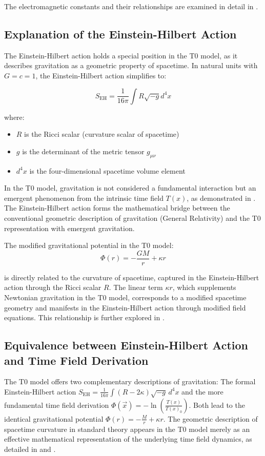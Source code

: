 \documentclass[12pt,a4paper]{article}
\newcommand{\Tfield}{T(x)}
\begin{document}
	The electromagnetic constants and their relationships are examined in detail in \cite{pascher_alpha_2025}.
	
	\subsection*{Explanation of the Einstein-Hilbert Action}
	
	The Einstein-Hilbert action holds a special position in the T0 model, as it describes gravitation as a geometric property of spacetime. In natural units with $G = c = 1$, the Einstein-Hilbert action simplifies to:
	
	\[
	S_{\mathrm{EH}} = \frac{1}{16\pi}\int R\sqrt{-g}d^4x
	\]
	
	where:
	\begin{itemize}
		\item $R$ is the Ricci scalar (curvature scalar of spacetime)
		\item $g$ is the determinant of the metric tensor $g_{\mu\nu}$
		\item $d^4x$ is the four-dimensional spacetime volume element
	\end{itemize}
	
	In the T0 model, gravitation is not considered a fundamental interaction but an emergent phenomenon from the intrinsic time field $T(x)$, as demonstrated in \cite{pascher_emergente_gravitation_2025}. The Einstein-Hilbert action forms the mathematical bridge between the conventional geometric description of gravitation (General Relativity) and the T0 representation with emergent gravitation.
	
	The modified gravitational potential in the T0 model:
	\[
	\Phi(r) = -\frac{GM}{r} + \kappa r
	\]
	
	is directly related to the curvature of spacetime, captured in the Einstein-Hilbert action through the Ricci scalar $R$. The linear term $\kappa r$, which supplements Newtonian gravitation in the T0 model, corresponds to a modified spacetime geometry and manifests in the Einstein-Hilbert action through modified field equations. This relationship is further explored in \cite{pascher_galaxies_2025}.
	
	\subsection*{Equivalence between Einstein-Hilbert Action and Time Field Derivation}
	
	The T0 model offers two complementary descriptions of gravitation: The formal Einstein-Hilbert action $S_{\mathrm{EH}} = \frac{1}{16\pi} \int (R - 2\kappa) \sqrt{-g} \, d^4x$ and the more fundamental time field derivation $\Phi(\vec{x}) = -\ln\left(\frac{\Tfield}{\Tfield_0}\right)$. Both lead to the identical gravitational potential $\Phi(r) = -\frac{M}{r} + \kappa r$. The geometric description of spacetime curvature in standard theory appears in the T0 model merely as an effective mathematical representation of the underlying time field dynamics, as detailed in \cite{pascher_emergente_gravitation_2025} and \cite{pascher_lagrange_2025}.
	
\end{document}
